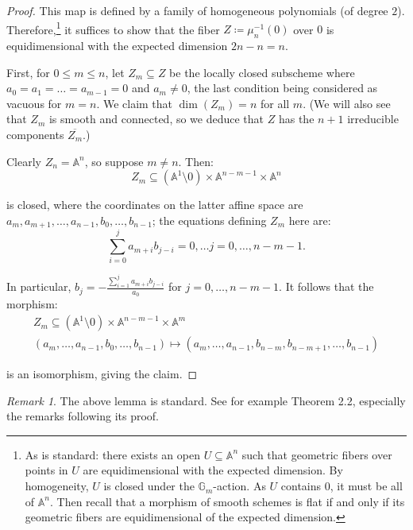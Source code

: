 \documentclass[reqno,11pt]{amsart}
\numberwithin{equation}{subsection}
\theoremstyle{remark}
\newtheorem{rem}[thm]{Remark}
\newcommand{\bA}{{\mathbb A}}
\newcommand{\bG}{{\mathbb G}}
\renewcommand{\subset}{\subseteq}
\begin{document}
\begin{proof}

This map is defined by a family of homogeneous polynomials
(of degree $2$). Therefore,\footnote{As is standard: there exists
an open $U \subset \bA^n$ such that geometric fibers over
points in $U$ are equidimensional with 
the expected dimension. By homogeneity, $U$
is closed under the $\bG_m$-action. As $U$ contains $0$,
it must be all of $\bA^n$. Then recall that a morphism
of smooth schemes is flat if and only if its geometric fibers are
equidimensional of the expected dimension.}
it suffices to show that the
fiber $Z \coloneqq \mu_n^{-1}(0)$ 
over $0$ is equidimensional with the expected
dimension $2n - n = n$. 

First, for $0 \leq m \leq n$, let $Z_m \subset Z$ be the locally
closed subscheme where $a_0 = a_1 = \ldots = a_{m-1} = 0$ 
and $a_m \neq 0$, the last condition being considered as vacuous
for $m = n$. We claim that $\dim(Z_m) = n$ for all $m$. (We
will also see that $Z_m$ is smooth and connected, so we deduce
that $Z$ has the $n+1$ irreducible components $\overline{Z_m}$.)

Clearly $Z_n = \bA^n$, so 
suppose $m \neq n$. Then:
%
\[
Z_m \subset (\bA^1 \setminus 0) \times \bA^{n-m-1} \times \bA^n
\]

\noindent is closed, where the coordinates on the latter affine
space are $a_m,a_{m+1},\ldots,a_{n-1},b_0,\ldots,b_{n-1}$;
the equations defining $Z_m$ here are:
%
\[
\sum_{i=0}^j a_{m+i} b_{j-i} = 0, \ldots j = 0,\ldots,n-m-1.
\]

\noindent In particular, 
$b_j = -\frac{\sum_{i=1}^j a_{m+i} b_{j-i}}{a_0}$ for
$j = 0,\ldots,n-m-1$. It follows
that the morphism:
%
\[
\begin{gathered}
Z_m \subset 
(\bA^1 \setminus 0) \times \bA^{n-m-1} \times  \bA^{m} \\
(a_m,\ldots,a_{n-1},b_0,\ldots,b_{n-1}) \mapsto 
(a_m,\ldots,a_{n-1},b_{n-m},b_{n-m+1},\ldots,b_{n-1})
\end{gathered}
\]

\noindent is an isomorphism, giving the claim.

\end{proof}

\begin{rem}

The above lemma is standard. See for example 
\cite{goward-smith} Theorem 2.2, especially the remarks 
following its proof.

\end{rem}
\end{document}
